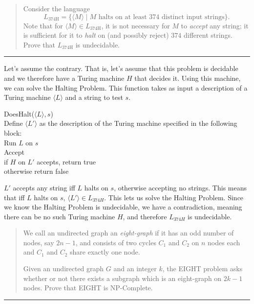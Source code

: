 \documentclass[11pt]{article}
\begin{document}



\begin{quote}
Consider the language $$L_{\text{374H}} = \{ \langle M\rangle
      \mid M \text{~halts on at least 374 distinct input strings}\}.$$ Note that
      for $\langle M\rangle \in L_{\text{374H}}$, it is not necessary
      for $M$ to {\em accept} any string; it is sufficient for it to
      {\em halt} on (and possibly reject) $374$ different strings. Prove that
      $L_{\text{374H}}$ is undecidable.
\end{quote}
\hrule



\begin{solution}
    Let's assume the contrary. That is, let's assume that this problem is decidable and we therefore have a Turing machine $H$ that decides it. 
    Using this machine, we can solve the Halting Problem. This function takes as input a description of a Turing machine $\langle L \rangle$ and a string to
    test $s$.
    \begin{algo}
        DoesHalt($\langle L \rangle, s$) \+
        \\ Define $\langle L' \rangle$ as the description of the Turing machine specified in the following block: \+
        \\ Run $L$ on $s$
        \\ Accept \-
        \\ if $H$ on $L'$ accepts, return true
        \\ otherwise return false
    \end{algo}
    $L'$ accepts any string iff $L$ halts on $s$, otherwise accepting no strings. This means that iff $L$ halts on $s$, $\langle L' \rangle \in L_{374H}$. This lets us solve the Halting Problem. Since we know the Halting Problem is undecidable, we have a contradiction, meaning there can be no such Turing machine $H$, and therefore $L_{374H}$ is undecidable. 
\end{solution}


\begin{quote}
We call an undirected graph an \emph{eight-graph} if it has
      an odd number of nodes, say $2n-1$, and consists of two cycles
      $C_1$ and $C_2$ on $n$ nodes each and $C_1$ and $C_2$ share
      exactly one node. 

  Given an undirected graph $G$ and an integer $k$, the EIGHT
  problem asks whether or not there exists a subgraph which is an eight-graph
  on $2k-1$ nodes. Prove that EIGHT is NP-Complete.
\end{quote}
\hrule
\end{document}
